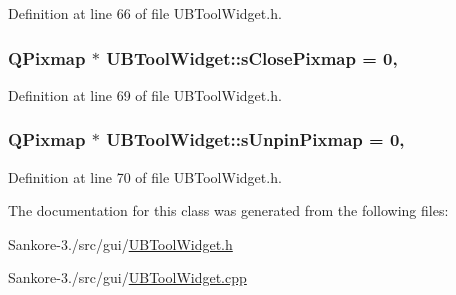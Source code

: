 Definition at line 66 of file U\-B\-Tool\-Widget.\-h.

\hypertarget{class_u_b_tool_widget_acd63ebbed200f2bed88266e8886a88d1}{
\subsubsection[{s\-Close\-Pixmap}]{\setlength{\rightskip}{0pt plus 5cm}Q\-Pixmap $\ast$ U\-B\-Tool\-Widget\-::s\-Close\-Pixmap = 0\hspace{0.3cm}{\ttfamily [static]}, {\ttfamily [protected]}}}\label{dc/de3/class_u_b_tool_widget_acd63ebbed200f2bed88266e8886a88d1}


Definition at line 69 of file U\-B\-Tool\-Widget.\-h.

\hypertarget{class_u_b_tool_widget_a19de57977d73ad9520ef5a4978340aa7}{
\subsubsection[{s\-Unpin\-Pixmap}]{\setlength{\rightskip}{0pt plus 5cm}Q\-Pixmap $\ast$ U\-B\-Tool\-Widget\-::s\-Unpin\-Pixmap = 0\hspace{0.3cm}{\ttfamily [static]}, {\ttfamily [protected]}}}\label{dc/de3/class_u_b_tool_widget_a19de57977d73ad9520ef5a4978340aa7}


Definition at line 70 of file U\-B\-Tool\-Widget.\-h.



The documentation for this class was generated from the following files\-:\begin{DoxyCompactItemize}
\item 
Sankore-\/3./src/gui/\hyperlink{_u_b_tool_widget_8h}{U\-B\-Tool\-Widget.\-h}\item 
Sankore-\/3./src/gui/\hyperlink{_u_b_tool_widget_8cpp}{U\-B\-Tool\-Widget.\-cpp}\end{DoxyCompactItemize}
